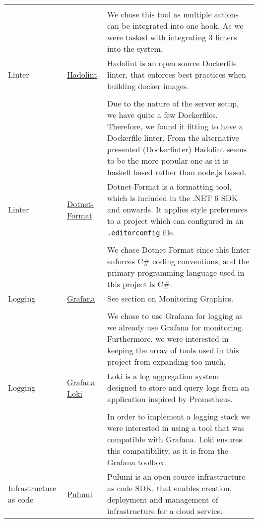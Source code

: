 \begin{longtable}{|p{}|p{} | p{}|}
    &&\\
    && We chose this tool as multiple actions can be integrated into one hook. As we were tasked with integrating 3 linters into the system.\\
    \hline
    Linter & \href{https://github.com/hadolint/hadolint}{Hadolint} & Hadolint is an open source Dockerfile linter, that enforces best practices when building docker images.\\
    &&\\
    && Due to the nature of the server setup, we have quite a few Dockerfiles. Therefore, we found it fitting to have a Dockerfile linter. From the alternative presented (\href{https://github.com/RedCoolBeans/dockerlint}{Dockerlinter}) Hadolint seems to be the more popular one as it is haskell based rather than node.js based.\\
    \hline
    Linter & \href{https://learn.microsoft.com/en-us/dotnet/core/tools/dotnet-format}{Dotnet-Format} & Dotnet-Format is a formatting tool, which is included in the .NET 6 SDK and onwards. It applies style preferences to a project which can configured in an \texttt{.editorconfig} file.\\
    &&\\
    && We chose Dotnet-Format since this linter enforces C\# coding conventions, and the primary programming language used in this project is C\#.\\
    \hline
    Logging & \href{https://grafana.com/}{Grafana} & See section on Monitoring Graphics.\\
    &&\\
    && We chose to use Grafana for logging as we already use Grafana for monitoring. Furthermore, we were interested in keeping the array of tools used in this project from expanding too much.\\
    \hline
    Logging & \href{https://grafana.com/docs/loki/latest/}{Grafana Loki} & Loki is a log aggregation system designed to store and query logs from an application inspired by Prometheus.\\
    &&\\
    && In order to implement a logging stack we were interested in using a tool that was compatible with Grafana. Loki ensures this compatibility, as it is from the Grafana toolbox.\\
    \hline
    Infrastructure as code & \href{https://www.pulumi.com/docs/}{Pulumi} & Pulumi is an open source infrastructure as code SDK, that enables creation, deployment and management of infrastructure for a cloud service.\\

\end{longtable}

